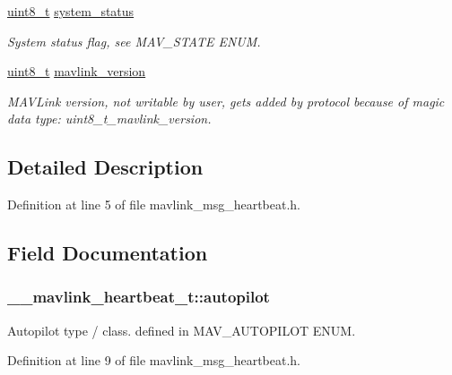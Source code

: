 \begin{DoxyCompactItemize}
\hyperlink{stdint_8h_aba7bc1797add20fe3efdf37ced1182c5}{uint8\-\_\-t} \hyperlink{struct____mavlink__heartbeat__t_a914b772577c4898cc5bfe4ece1c8529d}{system\-\_\-status}
\begin{DoxyCompactList}\small\item\em System status flag, see M\-A\-V\-\_\-\-S\-T\-A\-T\-E E\-N\-U\-M. \end{DoxyCompactList}\item 
\hyperlink{stdint_8h_aba7bc1797add20fe3efdf37ced1182c5}{uint8\-\_\-t} \hyperlink{struct____mavlink__heartbeat__t_a235d5b6a09fa9b24b3ef7b7a28d15b97}{mavlink\-\_\-version}
\begin{DoxyCompactList}\small\item\em M\-A\-V\-Link version, not writable by user, gets added by protocol because of magic data type\-: uint8\-\_\-t\-\_\-mavlink\-\_\-version. \end{DoxyCompactList}\end{DoxyCompactItemize}


\subsection{Detailed Description}


Definition at line 5 of file mavlink\-\_\-msg\-\_\-heartbeat.\-h.



\subsection{Field Documentation}
\hypertarget{struct____mavlink__heartbeat__t_a5be04782d8a0bb715ad26c25cce74b9b}{
\subsubsection[{autopilot}]{ \-\_\-\-\_\-mavlink\-\_\-heartbeat\-\_\-t\-::autopilot}}\label{struct____mavlink__heartbeat__t_a5be04782d8a0bb715ad26c25cce74b9b}


Autopilot type / class. defined in M\-A\-V\-\_\-\-A\-U\-T\-O\-P\-I\-L\-O\-T E\-N\-U\-M. 



Definition at line 9 of file mavlink\-\_\-msg\-\_\-heartbeat.\-h.


